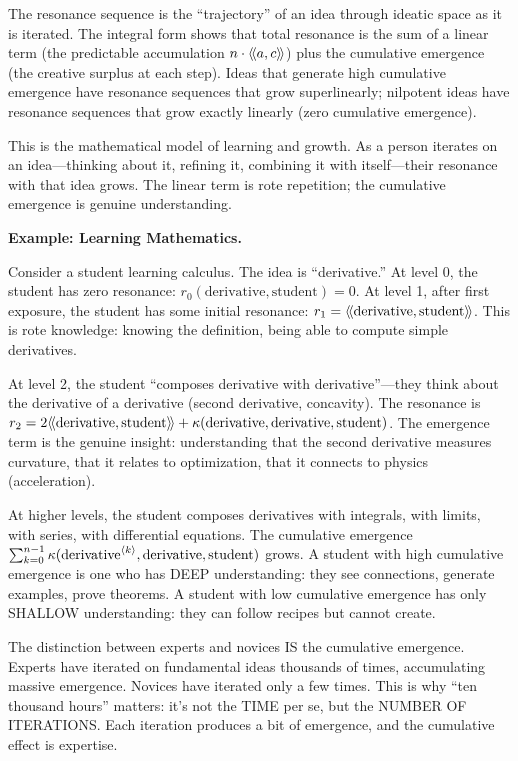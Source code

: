 \begin{interpretation}
The resonance sequence is the ``trajectory'' of an idea through ideatic space
as it is iterated. The integral form shows that total resonance is the sum of
a linear term (the predictable accumulation $n \cdot \langle\!\langle a, c \rangle\!\rangle$) plus the
cumulative emergence (the creative surplus at each step). Ideas that generate
high cumulative emergence have resonance sequences that grow superlinearly;
nilpotent ideas have resonance sequences that grow exactly linearly (zero
cumulative emergence).

This is the mathematical model of learning and growth. As a person iterates on
an idea---thinking about it, refining it, combining it with itself---their
resonance with that idea grows. The linear term is rote repetition; the
cumulative emergence is genuine understanding.

\textbf{Example: Learning Mathematics.}

Consider a student learning calculus. The idea is ``derivative.'' At level 0,
the student has zero resonance: $r_0(\text{derivative}, \text{student}) = 0$.
At level 1, after first exposure, the student has some initial resonance:
$r_1 = \langle\!\langle \text{derivative}, \text{student} \rangle\!\rangle$. This is rote knowledge: knowing
the definition, being able to compute simple derivatives.

At level 2, the student ``composes derivative with derivative''---they think
about the derivative of a derivative (second derivative, concavity). The resonance
is $r_2 = 2\langle\!\langle \text{derivative}, \text{student} \rangle\!\rangle + \kappa(\text{derivative}, \text{derivative}, \text{student})$.
The emergence term is the genuine insight: understanding that the second derivative
measures curvature, that it relates to optimization, that it connects to physics
(acceleration).

At higher levels, the student composes derivatives with integrals, with limits,
with series, with differential equations. The cumulative emergence
$\sum_{k=0}^{n-1} \kappa(\text{derivative}^{\langle k \rangle}, \text{derivative}, \text{student})$
grows. A student with high cumulative emergence is one who has DEEP understanding:
they see connections, generate examples, prove theorems. A student with low
cumulative emergence has only SHALLOW understanding: they can follow recipes
but cannot create.

The distinction between experts and novices IS the cumulative emergence. Experts
have iterated on fundamental ideas thousands of times, accumulating massive
emergence. Novices have iterated only a few times. This is why ``ten thousand
hours'' matters: it's not the TIME per se, but the NUMBER OF ITERATIONS. Each
iteration produces a bit of emergence, and the cumulative effect is expertise.


\end{interpretation}
